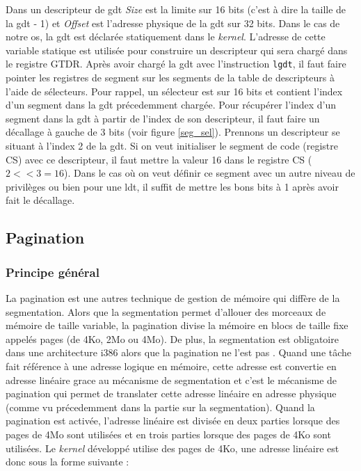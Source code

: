 Dans un descripteur de \acrshort{gdt} \textit{Size} est la limite sur 16 bits
(c'est à dire la taille de la \acrshort{gdt} - 1) et \textit{Offset} est l'adresse
physique de la \acrshort{gdt} sur 32 bits. Dans le cas de notre \acrshort{os},
la \acrshort{gdt} est déclarée statiquement dans le \textit{kernel}. L'adresse
de cette variable statique est utilisée pour construire un descripteur qui sera
chargé dans le registre GTDR. Après avoir chargé la \acrshort{gdt} avec l'instruction
\texttt{lgdt}, il faut faire pointer les registres de segment sur les
segments de la table de descripteurs à l'aide de sélecteurs. Pour rappel, un sélecteur
est sur 16 bits et contient l'index d'un segment dans la \acrshort{gdt} précedemment
chargée. Pour récupérer l'index d'un segment dans la \acrshort{gdt} à partir de
l'index de son descripteur, il faut faire un décallage à gauche de 3 bits
(voir figure \ref{seg_sel}). Prennons un descripteur se situant à l'index 2 de
la \acrshort{gdt}. Si on veut initialiser le segment de code (registre CS) avec
ce descripteur, il faut mettre la valeur 16 dans le registre CS ($2 << 3 = 16$).
Dans le cas où on veut définir ce segment avec un autre niveau de privilèges
ou bien pour une \acrshort{ldt}, il suffit de mettre les bons bits à 1 après avoir
fait le décallage.

\newpage

\subsection{Pagination}
\subsubsection{Principe général}
La pagination est une autres technique de gestion de mémoire qui diffère de la
segmentation. Alors que la segmentation permet d'allouer des morceaux de mémoire
de taille variable, la pagination divise la mémoire en blocs de taille fixe appelés
pages (de 4Ko, 2Mo ou 4Mo). De plus, la segmentation est obligatoire dans une
architecture i386 alors que la pagination ne l'est pas \cite{ref16}. Quand une tâche
fait référence à une adresse logique en mémoire, cette adresse est convertie en
adresse linéaire grace au mécanisme de segmentation et c'est le mécanisme de
pagination qui permet de translater cette adresse linéaire en adresse physique
(comme vu précedemment dans la partie sur la segmentation). Quand la
pagination est activée, l'adresse linéaire est divisée en deux parties lorsque
des pages de 4Mo sont utilisées et en trois parties lorsque des pages de 4Ko
sont utilisées. Le \textit{kernel} développé utilise des pages de 4Ko, une adresse
linéaire est donc sous la forme suivante :

